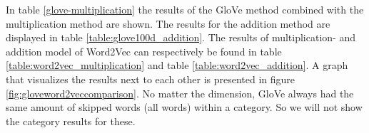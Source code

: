 In table \ref{glove-multiplication} the results of the GloVe method combined with the multiplication method are shown. The results for the addition method are displayed in table \ref{table:glove100d_addition}. The results of multiplication- and addition model of Word2Vec can respectively be found in table \ref{table:word2vec_multiplication} and table \ref{table:word2vec_addition}. A graph that visualizes the results next to each other is presented in figure \ref{fig:gloveword2veccomparison}.
\newline
No matter the dimension, GloVe always had the same amount of skipped words (all words) within a category. So we will not show the category results for these.
\label{sec:tabellen}
\begin{table}[H]
	\centering
	\hfill
\end{table}
